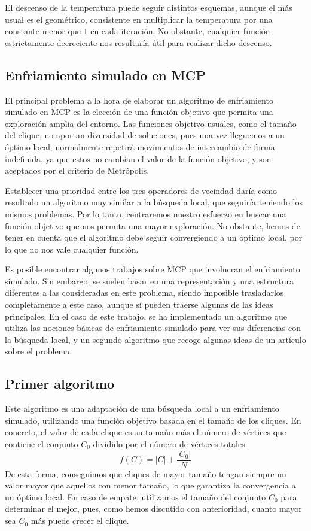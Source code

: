 El descenso de la temperatura puede seguir distintos esquemas, aunque el más usual es el
geométrico, consistente en multiplicar la temperatura por una constante menor que $1$
en cada iteración. No obstante, cualquier función estrictamente decreciente nos resultaría
útil para realizar dicho descenso.

\subsection{Enfriamiento simulado en MCP}

El principal problema a la hora de elaborar un algoritmo de enfriamiento simulado en MCP
es la elección de una función objetivo que permita una exploración amplia del entorno.
Las funciones objetivo usuales, como el tamaño del clique, no aportan diversidad de soluciones,
pues una vez lleguemos a un óptimo local, normalmente repetirá movimientos de intercambio
de forma indefinida, ya que estos no cambian el valor de la función objetivo, y son
aceptados por el criterio de Metrópolis.

Establecer una prioridad entre los tres operadores de vecindad daría como resultado un
algoritmo muy similar a la búsqueda local, que seguiría teniendo los mismos problemas.
Por lo tanto, centraremos nuestro esfuerzo en buscar una función objetivo que nos
permita una mayor exploración. No obstante, hemos de tener en cuenta que el algoritmo
debe seguir convergiendo a un óptimo local, por lo que no nos vale cualquier función.

Es posible encontrar algunos trabajos sobre MCP que involucran el enfriamiento simulado.
Sin embargo, se suelen basar en una representación y una estructura diferentes a las
consideradas en este problema, siendo imposible trasladarlos completamente a este caso,
aunque sí pueden traerse algunas de las ideas principales. En el caso de este trabajo,
se ha implementado un algoritmo que utiliza las nociones básicas de enfriamiento simulado
para ver sus diferencias con la búsqueda local, y un segundo algoritmo que recoge algunas
ideas de un artículo sobre el problema.

\subsection{Primer algoritmo}

Este algoritmo es una adaptación de una búsqueda local a un enfriamiento simulado, utilizando
una función objetivo basada en el tamaño de los cliques. En concreto, el valor de cada clique
es su tamaño más el número de vértices que contiene el conjunto $C_0$ dividido por el número
de vértices totales.
\[ f(C) = |C| + \frac{|C_0|}{N} \]
De esta forma, conseguimos que cliques de mayor tamaño tengan siempre un valor mayor que
aquellos con menor tamaño, lo que garantiza la convergencia a un óptimo local. En caso
de empate, utilizamos el tamaño del conjunto $C_0$ para determinar el mejor, pues, como
hemos discutido con anterioridad, cuanto mayor sea $C_0$ más puede crecer el clique.

